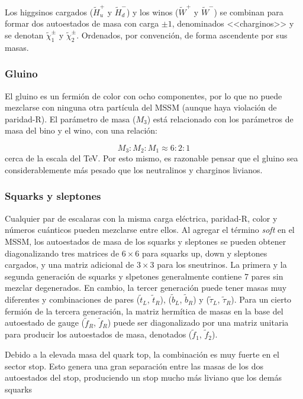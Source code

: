 Los higgsinos cargados ($\widetilde{H}^{+}_{u}$ y $\widetilde{H}^{-}_{d}$) y los winos ($\widetilde{W}^{+}$ y $\widetilde{W}^{-}$) se combinan para formar dos autoestados de masa con carga $\pm1$, denominados <<charginos>> y se denotan $\widetilde{\chi}^{\pm}_{1}$ y $\widetilde{\chi}^{\pm}_{2}$. Ordenados, por convención, de forma ascendente por sus masas.


\subsubsection{Gluino}

El gluino es un fermión de color con ocho componentes, por lo que no puede mezclarse con ninguna otra partícula del MSSM (aunque haya violación de paridad-R). El parámetro de masa ($M_{3}$) está relacionado con los parámetros de masa del bino y el wino, con una relación:

\begin{equation}
M_{3}:M_{2}:M_{1} \approx 6:2:1
\end{equation}
%
cerca de la escala del TeV. Por esto mismo, es razonable pensar que el gluino sea considerablemente más pesado que los neutralinos y charginos livianos.


\subsubsection{Squarks y sleptones}

Cualquier par de escalaras con la misma carga eléctrica, paridad-R, color y números cuánticos pueden mezclarse entre ellos. Al agregar el término \textit{soft} en el MSSM, los autoestados de masa de los squarks y sleptones se pueden obtener diagonalizando tres matrices de $6 \times 6$ para squarks up, down y sleptones cargados, y una matriz adicional de $3 \times 3$ para los sneutrinos. La primera y la segunda generación de squarks y slpetones generalmente contiene 7 pares sin mezclar degenerados. En cambio, la tercer generación puede tener masas muy diferentes y combinaciones de pares ($\tilde{t}_{L}$, $\tilde{t}_{R}$), ($\tilde{b}_{L}$, $\tilde{b}_{R}$) y ($\tilde{\tau}_{L}$, $\tilde{\tau}_{R}$). Para un cierto fermión de la tercera generación, la matriz hermítica de masas en la base del autoestado de gauge ($\tilde{f}_{R}$, $\tilde{f}_{R}$) puede ser diagonalizado por una matriz unitaria para producir los autoestados de masa, denotados ($\tilde{f}_{1}$, $\tilde{f}_{2}$).

Debido a la elevada masa del quark top, la combinación es muy fuerte en el sector stop. Esto genera una gran separación entre las masas de los dos autoestados del stop, produciendo un stop mucho más liviano que los demás squarks

